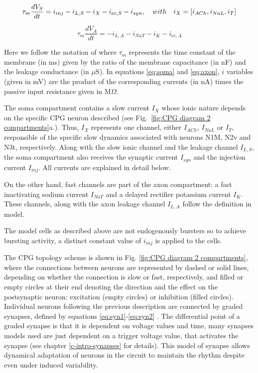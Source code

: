 \begin{equation}
	\tau_m\frac{dV_S}{dt} = i_{inj} - i_{L,S} - i_X - i_{ec,S} - i_{syn} \\,
	\quad with \quad i_X = [i_{ACh},i_{NaL},i_T]
	\label{eq:soma}
\end{equation}

\begin{equation}
	\tau_m\frac{dV_A}{dt} = -i_{L,A} - i_{NaT} - i_K - i_{ec,A}
	\label{eq:axon}
\end{equation}

\noindent Here we follow the notation of \textcite{vavoulis_dynamic_2007} where $\tau_m$ represents the time constant of the membrane (in ms) given by the ratio of the membrane capacitance (in nF) and the leakage conductance (in $\mu$S).  In equations \ref{eq:soma} and \ref{eq:axon}, $i$ variables (given in mV) are the product of the corresponding currents (in nA) times the passive input resistance given in M$\Omega$.

The soma compartment contains a slow current $I_X$ whose ionic nature depends on the specific CPG neuron described (see Fig.~\ref{fig:CPG diagram 2 compartments}a.). Thus, $I_X$  represents one channel, either $I_{ACh}$, $I_{NaL}$ or $I_{T}$, responsible of the specific slow dynamics associated with neurons N1M, N2v and N3t, respectively.  Along with the slow ionic channel and the leakage channel  $I_{L,S}$, the soma compartment also receives the synaptic current $I_{syn}$ and the injection current $I_{inj}$. All currents are explained in detail below.

On the other hand, fast channels are part of the axon compartment: a fast inactivating sodium current $I_{NaT}$ and a delayed rectifier potassium current $I_{K}$. These channels, along with the axon leakage channel  $I_{L,A}$ follow the definition in \textcite{hodgkin_quantitative_1952} model.

The model cells as described above are not endogenously bursters so to achieve bursting activity, a distinct constant value of  \(i_{inj}\) is applied to the cells. 

The CPG topology scheme is shown in Fig. \ref{fig:CPG diagram 2 compartments}, where the connections between neurons are represented by dashed or solid lines, depending on whether the connection is slow or fast, respectively, and filled or empty circles at their end denoting the direction and the effect on the postsynaptic neuron: excitation (empty circles) or inhibition (filled circles).
Individual neurons following the previous description are connected by graded synapses, defined by equations \ref{eq:syn1}-\ref{eq:syn2} \parencite{vavoulis_dynamic_2007}. The differential point of a graded synapse is that it is dependent on voltage values and time, many synapses models used are just dependent on a trigger voltage value, that activates the synapse (see chapter \ref{c-intro-synapses} for details). This model of synapse allows dynamical adaptation of neurons in the circuit to maintain the rhythm despite even under induced variability. 

